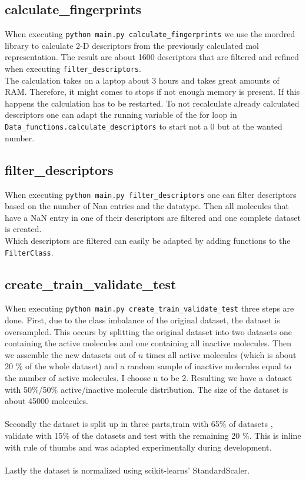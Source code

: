 \documentclass[12pt]{article}
\begin{document}
\subsection{calculate\_fingerprints}
When executing \texttt{python main.py calculate\_fingerprints} we use the mordred library \cite{mordredgit,mordred_paper} to calculate 2-D descriptors from the previously calculated mol representation. The result are about 1600 descriptors that are filtered and refined when executing \texttt{filter\_descriptors}.\\
The calculation takes on a laptop about 3 hours and takes great amounts of RAM. Therefore, it might comes to stops if not enough memory is present. If this happens the calculation has to be restarted. To not recalculate already calculated descriptors one can adapt the running variable of the for loop in \texttt{Data\_functions.calculate\_descriptors} to start not a 0 but at the wanted number. 

\subsection{filter\_descriptors}
When executing \texttt{python main.py filter\_descriptors} one can filter descriptors based on the number of Nan entries and the datatype. Then all molecules that have a NaN entry in one of their descriptors are filtered and one complete dataset is created.\\
Which descriptors are filtered can easily be adapted by adding functions to the \texttt{FilterClass}.

\subsection{create\_train\_validate\_test}
When executing \texttt{python main.py create\_train\_validate\_test} three steps are done. First, due to the class imbalance of the original dataset, the dataset is oversampled. This occurs by splitting the original dataset into two datasets one containing  the active molecules and one containing all inactive molecules. Then we assemble the new datasets out of $n$ times all active molecules (which is about 20 \% of the whole dataset) and a random sample of inactive molecules equal to the number of active molecules. I choose n to be 2. Resulting we have a dataset with 50\%/50\% active/inactive molecule distribution. The size of the dataset is about 45000 molecules.\\\\
%
Secondly the dataset is split up in three parts,train with 65\% of datasets , validate with 15\% of the datasets and test with the remaining 20 \%.  This is inline with rule of thumbs and was adapted experimentally during development.\\\\
%
Lastly the dataset is normalized using scikit-learns' StandardScaler.
\end{document}
